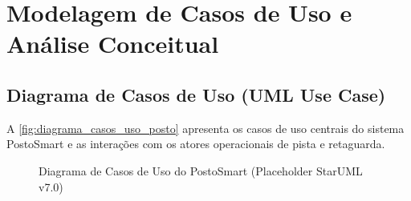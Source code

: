 
\chapter{Modelagem de Casos de Uso e Análise Conceitual}
\label{cap:modelagem_casos_uso}

\section{Diagrama de Casos de Uso (UML Use Case)}

A \autoref{fig:diagrama_casos_uso_posto} apresenta os casos de uso centrais do sistema PostoSmart e as interações com os atores operacionais de pista e retaguarda.

\begin{figure}[htbp]
    \centering
    \caption{Diagrama de Casos de Uso do PostoSmart (Placeholder StarUML v7.0)}
    \label{fig:diagrama_casos_uso_posto}
\end{figure}

